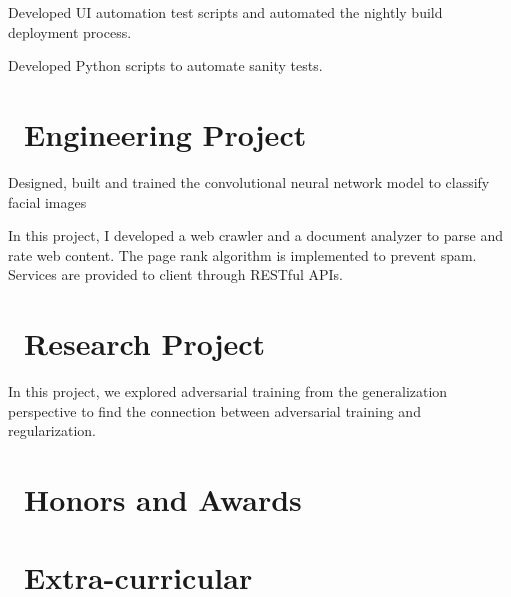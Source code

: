 \documentclass{resume}
\begin{document}
Developed UI automation test scripts and automated the nightly build deployment process.


Developed Python scripts to automate sanity tests.

\section{\faUsers\ Engineering Project}
Designed, built and trained the convolutional neural network model to classify facial images

In this project, I developed a web crawler and a document analyzer to parse and rate web content. The page rank algorithm is implemented to prevent spam. Services are provided to client through RESTful APIs.

\section{\faUsers\ Research Project}
In this project, we explored adversarial training from the generalization perspective to find the connection between adversarial training and regularization.

\section{\faHeartO\ Honors and Awards}

\section{\faInfo\ Extra-curricular}

%
%
\end{document}
